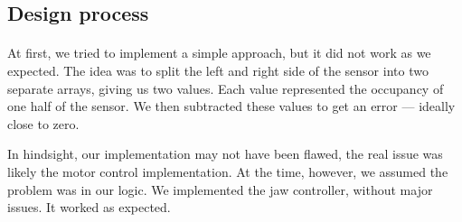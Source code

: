 \documentclass[english]{article}
\begin{document}
		\subsection{Design process}
			\paragraph{}
			At first, we tried to implement a simple approach, but it did not work as we expected.
			The idea was to split the left and right side of the sensor into two separate arrays, 
			giving us two values. Each value represented the occupancy of one half of the sensor. 
			We then subtracted these values to get an error — ideally close to zero. 

			In hindsight, our implementation may not have been flawed, the real issue was likely 
			the motor control implementation. At the time, however, we assumed the problem was in our logic. 
			We implemented the jaw controller, without major issues. It worked as expected.





\end{document}

